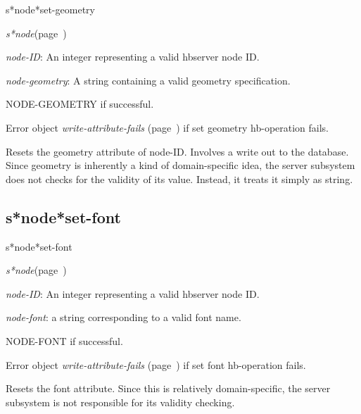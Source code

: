 \begin{description}
\item [Name:]  s*node*set-geometry

\item [Class:] {\sl s*node}\hfill(page~\pageref{s*node})

\item [Parameters:]
\item {\sl node-ID}:   An integer representing
a valid hbserver node ID.

\item {\sl node-geometry}:  A string containing a valid 
geometry specification. 
 

\item [Return-value:]
NODE-GEOMETRY if successful.

Error object {\sl write-attribute-fails} (page~\pageref{write-attribute-fails}) if set geometry
hb-operation fails.

\item [Description:]
Resets the geometry attribute of node-ID.  
Involves a write out to the database.
Since geometry is inherently a kind of 
domain-specific idea, the server subsystem
does not checks for the validity of its
value. Instead, it treats it simply as
string. 

\item [Public:]



\end{description}
\horizontalline

\subsection{s*node*set-font}
\label{s*node*set-font}

\begin{description}
\item [Name:]  s*node*set-font

\item [Class:] {\sl s*node}\hfill(page~\pageref{s*node})

\item [Parameters:]
\item {\sl node-ID}:   An integer representing
a valid hbserver node ID.

\item {\sl node-font}:  a string corresponding to a valid font name.


\item [Return-value:]
NODE-FONT if successful.

Error object {\sl write-attribute-fails} (page~\pageref{write-attribute-fails}) if set font
hb-operation fails.

\item [Description:]
Resets the font attribute.  Since this
is relatively domain-specific, the server
subsystem is not responsible for its
validity checking.

\item [Public:]



\end{description}
\horizontalline

